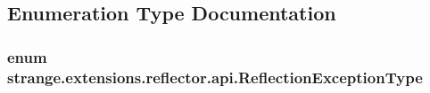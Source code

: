\subsection{Enumeration Type Documentation}
\hypertarget{namespacestrange_1_1extensions_1_1reflector_1_1api_a4470d7d3edf61dfa229aec6e9a914159}{
\subsubsection[{Reflection\-Exception\-Type}]{\setlength{\rightskip}{0pt plus 5cm}enum {\bf strange.\-extensions.\-reflector.\-api.\-Reflection\-Exception\-Type}}}\label{namespacestrange_1_1extensions_1_1reflector_1_1api_a4470d7d3edf61dfa229aec6e9a914159}
